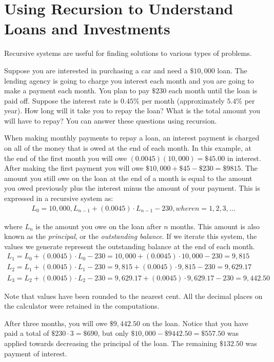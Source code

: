 \documentclass[10pt,]{book}
\theoremstyle{plain}
\theoremstyle{definition}
\theoremstyle{definition}
\numberwithin{equation}{section}
\begin{document}
\section[{Using Recursion to Understand Loans and Investments}]{Using Recursion to Understand Loans and Investments}\label{chapter04-section02}
Recursive systems are useful for finding solutions to various types of problems.%
\par
Suppose you are interested in purchasing a car and need a \(\$10,000\) loan. The lending agency is going to charge you interest each month and you are going to make a payment each month. You plan to pay \(\$230\) each month until the loan is paid off. Suppose the interest rate is \(0.45\%\) per month (approximately \(5.4\%\) per year). How long will it take you to repay the loan? What is the total amount you will have to repay?  You can answer these questions using recursion.%
\par
When making monthly payments to repay a loan, an interest payment is charged on all of the money that is owed at the end of each month.  In this example, at the end of the first month you will owe \((0.0045)(10,000)=\$45.00\) in interest. After making the first payment you will owe \(\$10,000+\$45-\$230=\$9815\). The amount you still owe on the loan at the end of a month is equal to the amount you owed previously plus the interest minus the amount of your payment. This is expressed in a recursive system as:%
%
\begin{gather*}
L_0=10,000, L_{n-1}+(0.0045)\cdot L_{n-1}-230, where n=1,2,3,...
\end{gather*}
\par
where \(L_n\) is the amount you owe on the loan after \(n\) months.  This amount is also known as the \emph{principal}, or the \emph{outstanding balance}. If we iterate this system, the values we generate represent the outstanding balance at the end of each month.%
%
\begin{gather*}
L_1=L_0+(0.0045)\cdot L_0-230=10,000+(0.0045)\cdot 10,000-230=9,815\\
L_2=L_1+(0.0045)\cdot L_1-230=9,815+(0.0045)\cdot 9,815-230=9,629.17\\
L_3=L_2+(0.0045)\cdot L_2-230=9,629.17+(0.0045)\cdot 9,629.17-230=9,442.50
\end{gather*}
\par
Note that values have been rounded to the nearest cent.  All the decimal places on the calculator were retained in the computations.%
\par
After three months, you will owe \(\$9,442.50\) on the loan. Notice that you have paid a total of \(\$230\cdot 3=\$690\), but only \(\$10,000-\$9442.50=\$557.50\) was applied towards decreasing the principal of the loan. The remaining \(\$132.50\) was payment of interest.%
\end{document}
